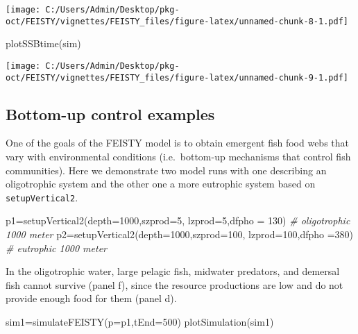 \documentclass[
]{article}
\newenvironment{Shaded}{\begin{snugshade}}{\end{snugshade}}
\newcommand{\AttributeTok}[1]{\textcolor[rgb]{0.77,0.63,0.00}{#1}}
\newcommand{\CommentTok}[1]{\textcolor[rgb]{0.56,0.35,0.01}{\textit{#1}}}
\newcommand{\DecValTok}[1]{\textcolor[rgb]{0.00,0.00,0.81}{#1}}
\newcommand{\FunctionTok}[1]{\textcolor[rgb]{0.00,0.00,0.00}{#1}}
\newcommand{\NormalTok}[1]{#1}
\newcommand{\OtherTok}[1]{\textcolor[rgb]{0.56,0.35,0.01}{#1}}
\begin{document}
\texttt{[image: C:/Users/Admin/Desktop/pkg-oct/FEISTY/vignettes/FEISTY\_files/figure-latex/unnamed-chunk-8-1.pdf]}

\begin{Shaded}
\begin{Highlighting}[]
\FunctionTok{plotSSBtime}\NormalTok{(sim)}
\end{Highlighting}
\end{Shaded}

\texttt{[image: C:/Users/Admin/Desktop/pkg-oct/FEISTY/vignettes/FEISTY\_files/figure-latex/unnamed-chunk-9-1.pdf]}

\hypertarget{bottom-up-control-examples}{%
\subsection{Bottom-up control
examples}\label{bottom-up-control-examples}}

One of the goals of the FEISTY model is to obtain emergent fish food
webs that vary with environmental conditions (i.e.~bottom-up mechanisms
that control fish communities). Here we demonstrate two model runs with
one describing an oligotrophic system and the other one a more eutrophic
system based on \texttt{setupVertical2}.

\begin{Shaded}
\begin{Highlighting}[]
\NormalTok{p1}\OtherTok{=}\FunctionTok{setupVertical2}\NormalTok{(}\AttributeTok{depth=}\DecValTok{1000}\NormalTok{,}\AttributeTok{szprod=}\DecValTok{5}\NormalTok{, }\AttributeTok{lzprod=}\DecValTok{5}\NormalTok{,}\AttributeTok{dfpho =} \DecValTok{130}\NormalTok{) }\CommentTok{\# oligotrophic 1000 meter}
\NormalTok{p2}\OtherTok{=}\FunctionTok{setupVertical2}\NormalTok{(}\AttributeTok{depth=}\DecValTok{1000}\NormalTok{,}\AttributeTok{szprod=}\DecValTok{100}\NormalTok{, }\AttributeTok{lzprod=}\DecValTok{100}\NormalTok{,}\AttributeTok{dfpho =}\DecValTok{380}\NormalTok{) }\CommentTok{\# eutrophic 1000 meter}
\end{Highlighting}
\end{Shaded}

In the oligotrophic water, large pelagic fish, midwater predators, and
demersal fish cannot survive (panel f), since the resource productions
are low and do not provide enough food for them (panel d).

\begin{Shaded}
\begin{Highlighting}[]
\NormalTok{sim1}\OtherTok{=}\FunctionTok{simulateFEISTY}\NormalTok{(}\AttributeTok{p=}\NormalTok{p1,}\AttributeTok{tEnd=}\DecValTok{500}\NormalTok{)}
\FunctionTok{plotSimulation}\NormalTok{(sim1)}
\end{Highlighting}
\end{Shaded}
\end{document}
